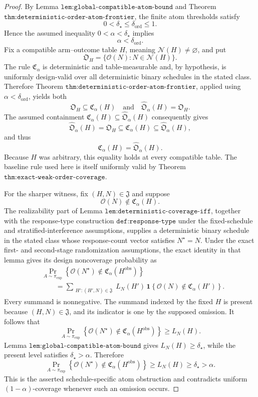 \documentclass{article}
\begin{document}
\begin{proof}
By Lemma \(\texttt{lem:global-compatible-atom-bound}\) and Theorem \(\texttt{thm:deterministic-order-atom-frontier}\), the finite atom thresholds satisfy
\[
0<\delta_\star\le \delta_{\mathrm{ord}}\le 1.
\]
Hence the assumed inequality \(0<\alpha<\delta_\star\) implies
\[
\alpha<\delta_{\mathrm{ord}}.
\]
Fix a compatible arm--outcome table \(H\), meaning \(\mathcal N(H)\ne\varnothing\), and put
\[
\mathfrak O_H=\{\mathcal O(N):N\in\mathcal N(H)\}.
\]
The rule \(\mathfrak C_\alpha\) is deterministic and table-measurable and, by hypothesis, is uniformly design-valid over all deterministic binary schedules in the stated class. Therefore Theorem \(\texttt{thm:deterministic-order-atom-frontier}\), applied using \(\alpha<\delta_{\mathrm{ord}}\), yields both
\[
\mathfrak O_H\subseteq\mathfrak C_\alpha(H)
\quad\text{and}\quad
\widehat{\mathfrak O}_\alpha(H)=\mathfrak O_H.
\]
The assumed containment \(\mathfrak C_\alpha(H)\subseteq\widehat{\mathfrak O}_\alpha(H)\) consequently gives
\[
\widehat{\mathfrak O}_\alpha(H)
=\mathfrak O_H
\subseteq\mathfrak C_\alpha(H)
\subseteq\widehat{\mathfrak O}_\alpha(H),
\]
and thus
\[
\mathfrak C_\alpha(H)=\widehat{\mathfrak O}_\alpha(H).
\]
Because \(H\) was arbitrary, this equality holds at every compatible table. The baseline rule used here is itself uniformly valid by Theorem \(\texttt{thm:exact-weak-order-coverage}\).

For the sharper witness, fix \((H,N)\in\mathfrak J\) and suppose
\[
\mathcal O(N)\notin\mathfrak C_\alpha(H).
\]
The realizability part of Lemma \(\texttt{lem:deterministic-coverage-iff}\), together with the response-type construction \(\texttt{def:response-type}\) under the fixed-schedule and stratified-interference assumptions, supplies a deterministic binary schedule in the stated class whose response-count vector satisfies \(N^\star=N\). Under the exact first- and second-stage randomization assumptions, the exact identity in that lemma gives its design noncoverage probability as
\[
\begin{aligned}
&\Pr_{A\sim\pi_{\exp}}\!\left\{
\mathcal O(N^\star)\notin
\mathfrak C_\alpha(H^{\mathrm{obs}})\right\}\\
&\qquad=
\sum_{\substack{H':(H',N)\in\mathfrak J}}
L_N(H')\,
\mathbf 1\!\left\{
\mathcal O(N)\notin\mathfrak C_\alpha(H')
\right\}.
\end{aligned}
\]
Every summand is nonnegative. The summand indexed by the fixed \(H\) is present because \((H,N)\in\mathfrak J\), and its indicator is one by the supposed omission. It follows that
\[
\Pr_{A\sim\pi_{\exp}}\!\left\{
\mathcal O(N^\star)\notin
\mathfrak C_\alpha(H^{\mathrm{obs}})\right\}
\ge L_N(H).
\]
Lemma \(\texttt{lem:global-compatible-atom-bound}\) gives \(L_N(H)\ge\delta_\star\), while the present level satisfies \(\delta_\star>\alpha\). Therefore
\[
\Pr_{A\sim\pi_{\exp}}\!\left\{
\mathcal O(N^\star)\notin
\mathfrak C_\alpha(H^{\mathrm{obs}})\right\}
\ge L_N(H)\ge\delta_\star>\alpha.
\]
This is the asserted schedule-specific atom obstruction and contradicts uniform \((1-\alpha)\)-coverage whenever such an omission occurs.


\end{proof}
\end{document}
